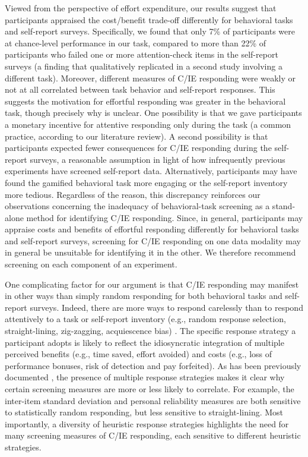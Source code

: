 \documentclass[a4paper,notitlepage,12pt]{article}
\begin{document}
\begin{refsection}[main]
Viewed from the perspective of effort expenditure, our results suggest that participants appraised the cost/benefit trade-off differently for behavioral tasks and self-report surveys. Specifically, we found that only 7\% of participants were at chance-level performance in our task, compared to more than 22\% of participants who failed one or more attention-check items in the self-report surveys (a finding that qualitatively replicated in a second study involving a different task). Moreover, different measures of C/IE responding were weakly or not at all correlated between task behavior and self-report responses. This suggests the motivation for effortful responding was greater in the behavioral task, though precisely why is unclear. One possibility is that we gave participants a monetary incentive for attentive responding only during the task (a common practice, according to our literature review). A second possibility is that participants expected fewer consequences for C/IE responding during the self-report surveys, a reasonable assumption in light of how infrequently previous experiments have screened self-report data. Alternatively, participants may have found the gamified behavioral task more engaging or the self-report inventory more tedious. Regardless of the reason, this discrepancy reinforces our observations concerning the inadequacy of behavioral-task screening as a stand-alone method for identifying C/IE responding. Since, in general, participants may appraise costs and benefits of effortful responding differently for behavioral tasks and self-report surveys, screening for C/IE responding on one data modality may in general be unsuitable for identifying it in the other. We therefore recommend screening on each component of an experiment.

One complicating factor for our argument is that C/IE responding may manifest in other ways than simply random responding for both behavioral tasks and self-report surveys. Indeed, there are more ways to respond carelessly than to respond attentively to a task or self-report inventory (e.g., random response selection, straight-lining, zig-zagging, acquiescence bias) \cite{curran2016methods}. The specific response strategy a participant adopts is likely to reflect the idiosyncratic integration of multiple perceived benefits (e.g., time saved, effort avoided) and costs (e.g., loss of performance bonuses, risk of detection and pay forfeited). As has been previously documented \cite{desimone2018dirty}, the presence of multiple response strategies makes it clear why certain screening measures are more or less likely to correlate. For example, the inter-item standard deviation and personal reliability measures are both sensitive to statistically random responding, but less sensitive to straight-lining. Most importantly, a diversity of heuristic response strategies highlights the need for many screening measures of C/IE responding, each sensitive to different heuristic strategies. 


\end{refsection}
\end{document}

